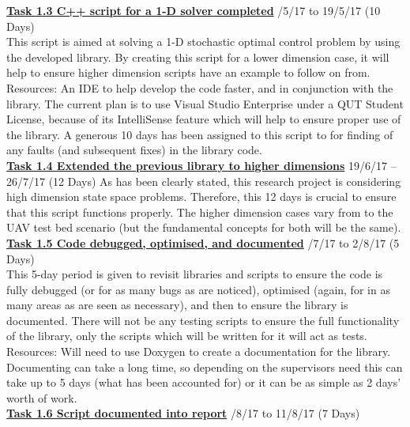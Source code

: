 \documentclass[11pt,draftd]{article}
\begin{document}
\begin{appendices}
		
	\noindent\underline{\textbf{Task 1.3 C++ script for a 1-D solver completed}} /5/17 to 19/5/17 (10 Days) \\
	
	\noindent This script is aimed at solving a 1-D stochastic optimal control problem by using the developed library. By creating this script for a lower dimension case, it will help to ensure higher dimension scripts have an example to follow on from. \\
	Resources: An IDE to help develop the code faster, and in conjunction with the library. The current plan is to use Visual Studio Enterprise under a QUT Student License, because of its IntelliSense feature which will help to ensure proper use of the library. A generous 10 days has been assigned to this script to for finding of any faults (and subsequent fixes) in the library code. \\
	
	\noindent\underline{\textbf{Task 1.4 Extended the previous library to higher dimensions}}
	19/6/17 -- 26/7/17 (12 Days)
	\noindent As has been clearly stated, this research project is considering high dimension state space problems. Therefore, this 12 days is crucial to ensure that this script functions properly. The higher dimension cases vary from \cite{zylong} to the UAV test bed scenario (but the fundamental concepts for both will be the same).\\
	
	\noindent\underline{\textbf{Task 1.5 Code debugged, optimised, and documented}} /7/17 to 2/8/17 (5 Days) \\
	
	\noindent This 5-day period is given to revisit libraries and scripts to ensure the code is fully debugged (or for as many bugs as are noticed), optimised (again, for in as many areas as are seen as necessary), and then to ensure the library is documented. There will not be any testing scripts to ensure the full functionality of the library, only the scripts which will be written for it will act as tests. \\
	Resources: Will need to use Doxygen to create a documentation for the library. Documenting can take a long time, so depending on the supervisors need this can take up to 5 days (what has been accounted for) or it can be as simple as 2 days’ worth of work.\\
	
	\noindent\underline{\textbf{Task 1.6 Script documented into report}} /8/17 to 11/8/17 (7 Days) \\
	

\end{appendices}
\end{document}
